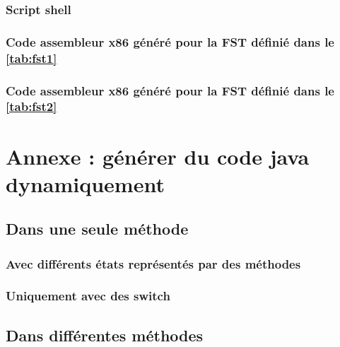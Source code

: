 \subsubsection{Script shell}



\clearpage
\subsubsection{Code assembleur x86 généré pour la FST définié dans le \autoref{tab:fst1}}



\clearpage
\subsubsection{Code assembleur x86 généré pour la FST définié dans le \autoref{tab:fst2}}



\clearpage

\section{Annexe : générer du code java dynamiquement}

\subsection{Dans une seule méthode}

\subsubsection{Avec différents états représentés par des méthodes}




\clearpage
\subsubsection{Uniquement avec des switch}



\clearpage
\subsection{Dans différentes méthodes}




